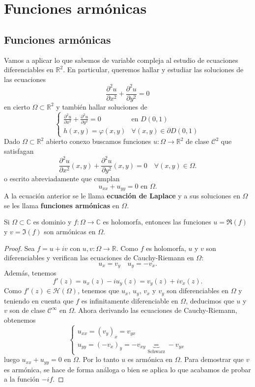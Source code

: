 \section{Funciones armónicas}
\subsection{Funciones armónicas}

Vamos a aplicar lo que sabemos de variable compleja al estudio de ecuaciones diferenciables en $\mathbb{R}^2$. En particular, queremos hallar y estudiar las soluciones de las ecuaciones  
\[
    \frac{\partial^2 u}{\partial x^2} + \frac{\partial^2 u}{\partial y^2} = 0
\]
en cierto $\Omega \subset \mathbb{R}^2$ y también hallar soluciones de 
\[
    \begin{cases}
        \frac{\partial^2 u}{\partial x^2} + \frac{\partial^2 u}{\partial y^2} = 0 & \text{en } D(0,1) \\
        h(x,y) = \varphi(x,y) & \forall (x,y) \in \partial D(0,1)
    \end{cases}
\]
Dado $\Omega \subset \mathbb{R}^2$ abierto conexo buscamos funciones $u:\Omega \to \mathbb{R}^2$ de clase $\mathcal{C}^2$ que satisfagan
\[
    \frac{\partial^2 u}{\partial x^2} (x,y) + \frac{\partial^2 u}{\partial y^2} (x,y) = 0 \quad \forall (x,y) \in \Omega.
\]
o escrito abreviadamente que cumplan
\[
    u_{xx} + u_{yy} = 0 \text{ en } \Omega.
\]
A la ecuación anterior se le llama \textbf{ecuación de Laplace} y a sus soluciones en $\Omega$ se les llama \textbf{funciones armónicas} en $\Omega$.

\begin{proposición}
    Si $\Omega \subset \mathbb{C}$ es dominio y $f:\Omega \to \mathbb{C}$ es holomorfa, entonces las funciones $u = \Re(f)$ y $v = \Im(f)$ son armónicas en $\Omega$.
\end{proposición}

\begin{proof}
    Sea $f = u + iv$ con $u,v:\Omega \to \mathbb{R}$. Como $f$ es holomorfa, $u$ y $v$ son diferenciables y verifican las ecuaciones de Cauchy-Riemann en $\Omega$:
    \[
        u_x = v_y \quad u_y = -v_x.
    \]
    Además, tenemos
    \[
        f'(z) = u_x(z) - iu_y(z) = v_y(z) + iv_x(z).
    \]
    Como $f'(z) \in \mathcal{H}(\Omega)$, tenemos que $u_x$, $u_y$, $v_x$ y $v_y$ son diferenciables en $\Omega$ y teniendo en cuenta que $f$ es infinitamente diferenciable en $\Omega$, deducimos que $u$ y $v$ son de clase $\mathcal{C}^\infty$ en $\Omega$.
    Ahora derivando las ecuaciones de Cauchy-Riemann, obtenemos
    \[
        \begin{cases}
            u_{xx} = (v_y)_x = v_{yx} \\
            u_{yy} = (-v_x)_y = -v_{xy} \underbrace{=}_{\text{Schwarz}} -v_{yx} 
        \end{cases}
    \]
    luego $u_{xx} + u_{yy} = 0$ en $\Omega$. Por lo tanto $u$ es armónica en $\Omega$. Para demostrar que $v$ es armónica, se hace de forma análoga o bien se aplica lo que acabamos de probar a la función $-if$.
\end{proof}

